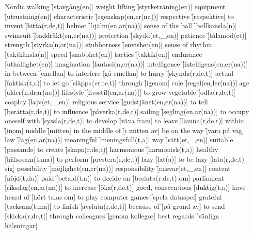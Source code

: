 \begin{questions}
\begin{multicols}{2}
        \question Nordic walking \f[stavgång(en)]
        \question weight lifting \f[styrketräning(en)]
        \question equipment \f[utrustning(en)]
        \question characteristic \f[egenskap(en,er(na))]
        \question respective \f[respektive]
        \question to invent \f[hitta(r,de,t)]
        \question helmet \f[hjälm(en,ar(na))]
        \question sense of the ball \f[bollkänsla(n)]
        \question swimsuit \f[baddräkt(en,er(na))]
        \question protection \f[skydd(et,\_,en)]
        \question patience \f[tålamod(et)]
        \question strength \f[styrka(n,or(na))]
        \question stubborness \f[envishet(en)]
        \question sense of rhythm \f[taktkänsla(n)]
        \question speed \f[snabbhet(en)]
        \question tactics \f[taktik(en)]
        \question endurance \f[uthållighet(en)]
        \question imagination \f[fantasi(n,er(na))]
        \question intelligence \f[intelligens(en,er(na))]
        \question in between \f[emellan]
        \question to interfere \f[gå emellan]
        \question to hurry \f[skynda(r,de,t)]
        \question actual \f[faktisk(t,a)]
        \question to let go \f[släppa(er,te,t)]
        \question through \f[igenom]
        \question rule \f[regel(en,ler(na))]
        \question age \f[ålder(n,drar(na))]
        \question lifestyle \f[livsstil(en,ar(na))]
        \question to grow vegetable \f[odla(r,de,t)]
        \question cosplay \f[lajv(et,\_,en)]
        \question religious service \f[gudstjänst(en,er(na))]
        \question to tell \f[berätta(r,de,t)]
        \question to influence \f[påverka(r,de,t)]
        \question sailing \f[segling(en,ar(na))]
        \question to occupy oneself with \f[syssla(r,de,t)]
        \question to develop \f[växa fram]
        \question to leave \f[lämna(r,de,t)]
        \question within \f[inom]
        \question middle \f[mitten]
        \question in the middle of \f[i mitten av]
        \question be on the way \f[vara på väg]
        \question law \f[lag(en,ar(na))]
        \question meaningful \f[meningsfull(t,a)]
        \question way \f[sätt(et,\_,en)]
        \question suitable \f[passande]
        \question to create \f[skapa(r,de,t)]
        \question harmonious \f[harmonisk(t,a)]
        \question healthy \f[hälsosam(t,ma)]
        \question to perform \f[prestera(r,de,t)]
        \question lazy \f[lat(a)]
        \question to be lazy \f[lata(r,de,t) sig]
        \question possibility \f[möjlighet(en,er(na))]
        \question responsibility \f[ansvar(et,\_,en)]
        \question content \f[nöjd(t,da)]
        \question paid \f[betald(t,a)]
        \question to decide on \f[besluta(r,de,t) om]
        \question parliament \f[riksdag(en,ar(na))]
        \question to increase \f[öka(r,de,t)]
        \question good, conscentious \f[duktig(t,a)]
        \question have heard of \f[hört talas om]
        \question to play computer games \f[spela dataspel]
        \question grateful \f[tacksam(t,ma)]
        \question to finish \f[avsluta(r,de,t)]
        \question because of \f[på grund av]
        \question to send \f[skicka(r,de,t)]
        \question through colleagues \f[genom kollegor]
        \question best regards \f[vänliga hälsningar]
    \end{multicols}
\end{questions}
